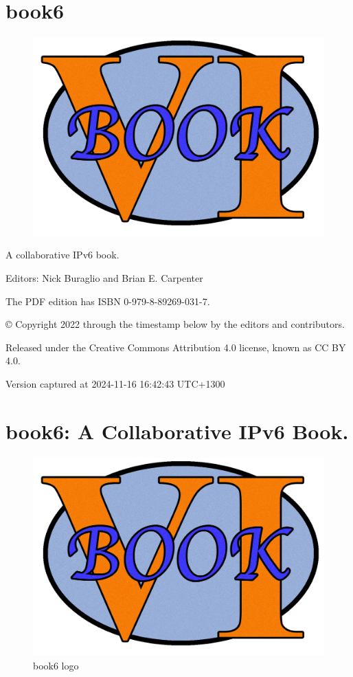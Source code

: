\documentclass[
]{article}
\author{}
\date{}
\begin{document}
\section{book6}\label{book6}

\begin{figure}
\centering
\includegraphics{book6logo.png}
\caption{}
\end{figure}

A collaborative IPv6 book.

Editors: Nick Buraglio and Brian E. Carpenter

The PDF edition has ISBN 0-979-8-89269-031-7.

© Copyright 2022 through the timestamp below by the editors and
contributors.

Released under the Creative Commons Attribution 4.0 license, known as CC
BY 4.0.

Version captured at 2024-11-16 16:42:43 UTC+1300

\pagebreak

\section{book6: A Collaborative IPv6
Book.}\label{book6-a-collaborative-ipv6-book}

\begin{figure}
\centering
\includegraphics{book6logo.png}
\caption{book6 logo}
\end{figure}
\end{document}

